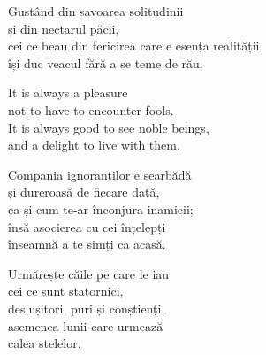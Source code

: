 Gustând din savoarea solitudinii\\
și din nectarul păcii,\\
cei ce beau din fericirea care e esența realității\\
își duc veacul fără a se teme de rău.


It is always a pleasure\\
not to have to encounter fools.\\
It is always good to see noble beings,\\
and a delight to live with them.


Compania ignoranților e searbădă\\
și dureroasă de fiecare dată,\\
ca și cum te-ar înconjura inamicii;\\
însă asocierea cu cei înțelepți\\
înseamnă a te simți ca acasă.


Urmărește căile pe care le iau\\
cei ce sunt statornici,\\
deslușitori, puri și conștienți,\\
asemenea lunii care urmează\\
calea stelelor.
